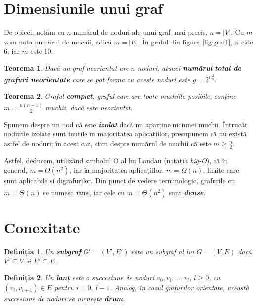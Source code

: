 \documentclass[9pt,a4paper]{report}
\newtheorem{definitie}{Definiția}
\newtheorem{teorema}{Teorema}
\begin{document}
\section{Dimensiunile unui graf}

De obicei, notăm cu $n$ numărul de noduri ale unui graf; mai precis, $n = |V|$. Cu $m$ vom nota numărul de muchii, adică $m = |E|$. În graful din figura \ref{fig:graf1}, $n$ este 6, iar $m$ este 10.

\begin{teorema}
    Dacă un graf neorientat are $n$ noduri, atunci \textbf{\textit{numărul total de grafuri neorientate}}\textsuperscript{\cite{milosescu}} care se pot forma cu aceste noduri este $g = 2^{C_n^2}$.
\end{teorema}

\begin{teorema}
    Graful \textbf{\textit{complet}}, graful care are toate muchiile posibile, conține $m = \frac{n(n-1)}{2}$ muchii\textsuperscript{\cite{milosescu}}, dacă este neorientat.
\end{teorema}

Spunem despre un nod că este \textbf{\textit{izolat}} dacă nu aparține niciunei muchii. Întrucât nodurile izolate sunt inutile în majoritatea aplicațiilor, presupunem că nu există astfel de noduri; în acest caz, știm despre numărul de muchii că este $m \geq \frac{n}{2}$.

Astfel, deducem, utilizând simbolul O al lui Landau (notația \textit{big-O}), că în general, $m = O(n^2)$, iar în majoritatea aplicațiilor, $m = \Omega(n)$, limite care sunt aplicabile și digrafurilor. Din punct de vedere terminologic, grafurile cu $m = \Theta(n)$ se numesc \textbf{\textit{rare}}, iar cele cu $m = \Theta(n^2)$ sunt \textbf{\textit{dense}}\textsuperscript{\cite{gabow}}.

\section{Conexitate}

\begin{definitie}
    Un \textbf{subgraf} $G' = (V', E')$ este un subgraf al lui $G = (V, E)$ dacă $V' \subseteq V$ și $E' \subseteq E$.
\end{definitie}
\begin{definitie}
    Un \textbf{lanț} este o succesiune de noduri $v_0, v_1, \dots, v_l$, $l \geq 0$, cu $(v_i, v_{i+1}) \in E$ pentru $i = \overline{0, \ l - 1}$. Analog, în cazul grafurilor orientate, această succesiune de noduri se numește \textbf{drum}.
\end{definitie}
\end{document}
